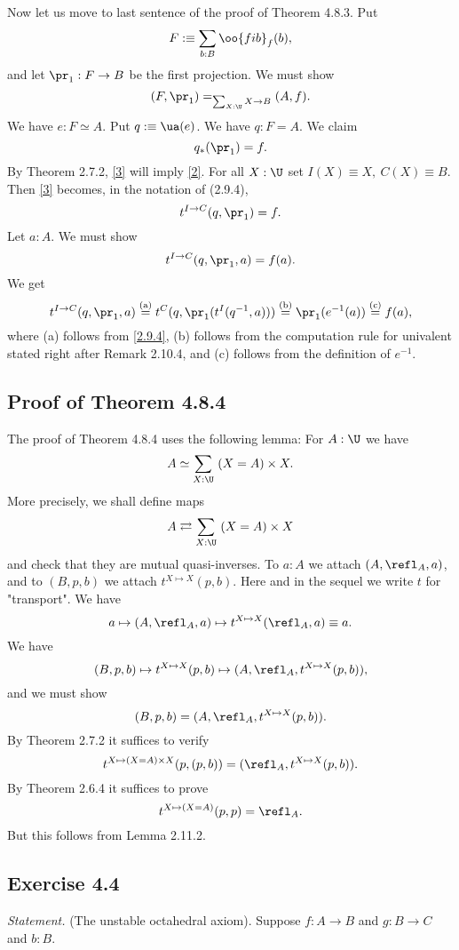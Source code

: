 \documentclass[12pt]{article}
\begin{document}
Now let us move to last sentence of the proof of Theorem 4.8.3. Put
$$
F:\equiv\sum_{b:B}\oo{fib}_f(b),
$$ 
and let $\pr_1:F\to B$ be the first projection. We must show 
\begin{equation}\label{2}
(F,\pr_1)=_{\sum_{X:\U}X\to B}(A,f).
\end{equation} 
We have $e:F\simeq A$. Put $q:\equiv\ua(e)$. We have $q:F=A$. We claim 
\begin{equation}\label{3}
q_*(\pr_1)=f.
\end{equation} 
By Theorem 2.7.2, \eqref{3} will imply \eqref{2}. For all $X:\U$ set $I(X)\equiv X,\ C(X)\equiv B$. Then \eqref{3} becomes, in the notation of (2.9.4), 
$$
t^{I\to C}(q,\pr_1)=f.
$$ 
Let $a:A$. We must show 
$$
t^{I\to C}(q,\pr_1,a)=f(a).
$$ 
We get 
$$
t^{I\to C}(q,\pr_1,a)\overset{\text{(a)}}=t^C(q,\pr_1(t^I(q^{-1},a)))\overset{\text{(b)}}=\pr_1(e^{-1}(a))\overset{\text{(c)}}=f(a),
$$ 
where (a) follows from \eqref{2.9.4}, (b) follows from the computation rule for univalent stated right after Remark 2.10.4, and (c) follows from the definition of $e^{-1}$.


\subsection{Proof of Theorem 4.8.4}

The proof of Theorem 4.8.4 uses the following lemma: For $A:\U$ we have 
$$
A\simeq\sum_{X:\U}\ (X=A)\times X.
$$
More precisely, we shall define maps 
$$
A\rightleftarrows\sum_{X:\U}\ (X=A)\times X
$$ 
and check that they are mutual quasi-inverses. To $a:A$ we attach $(A,\refl_A,a)$, and to $(B,p,b)$ we attach $t^{X\mapsto X}(p,b)$. Here and in the sequel we write $t$ for "transport". We have 
$$
a\mapsto(A,\refl_A,a)\mapsto t^{X\mapsto X}(\refl_A,a)\equiv a.
$$ 
We have 
$$
(B,p,b)\mapsto t^{X\mapsto X}(p,b)\mapsto(A,\refl_A,t^{X\mapsto X}(p,b)),
$$ 
and we must show 
$$
(B,p,b)=(A,\refl_A,t^{X\mapsto X}(p,b)).
$$ 
By Theorem 2.7.2 it suffices to verify 
$$
t^{X\mapsto (X=A)\times X}(p,(p,b))=(\refl_A,t^{X\mapsto X}(p,b)).
$$ 
By Theorem 2.6.4 it suffices to prove 
$$
t^{X\mapsto (X=A)}(p,p)=\refl_A.
$$ 
But this follows from Lemma 2.11.2. 


\subsection{Exercise 4.4}

\emph{Statement.} (The unstable octahedral axiom). Suppose $f:A\to B$ and $g:B\to C$ and $b:B$.
\end{document}
